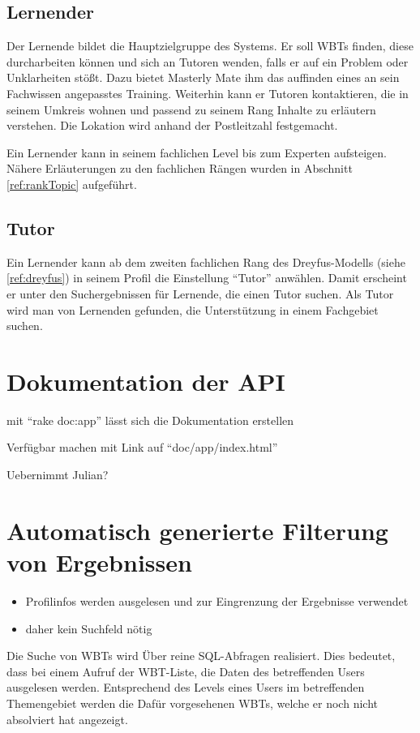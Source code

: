 \subsection{Lernender}
Der Lernende bildet die Hauptzielgruppe des Systems. Er soll WBTs finden, diese
durcharbeiten können und sich an Tutoren wenden, falls er auf ein Problem oder
Unklarheiten stößt. Dazu bietet Masterly Mate ihm das auffinden eines an sein
Fachwissen angepasstes Training. Weiterhin kann er Tutoren kontaktieren, die in
seinem Umkreis wohnen und passend zu seinem Rang Inhalte zu erläutern verstehen.
Die Lokation wird anhand der Postleitzahl festgemacht.

Ein Lernender kann in seinem fachlichen Level bis zum Experten aufsteigen.
Nähere Erläuterungen zu den fachlichen Rängen wurden in Abschnitt
\ref{ref:rankTopic} aufgeführt.

\subsection{Tutor}
Ein Lernender kann ab dem zweiten fachlichen Rang des Dreyfus-Modells (siehe
\ref{ref:dreyfus}) in seinem Profil die Einstellung "`Tutor"' anwählen. Damit
erscheint er unter den Suchergebnissen für Lernende, die einen Tutor suchen. Als
Tutor wird man von Lernenden gefunden, die Unterstützung in einem Fachgebiet
suchen.

\section{Dokumentation der API}
\begin {k}
mit "`rake doc:app"' lässt sich die Dokumentation erstellen

Verfügbar machen mit Link auf "`doc/app/index.html"'

Uebernimmt Julian?
\end{k}

\section{Automatisch generierte Filterung von Ergebnissen}
\begin{k}
\begin{itemize}
  \item Profilinfos werden ausgelesen und zur Eingrenzung der Ergebnisse
  verwendet
  \item daher kein Suchfeld nötig
\end{itemize}
\end{k}
Die Suche von WBTs wird Über reine SQL-Abfragen realisiert. 
Dies bedeutet, dass bei einem Aufruf der WBT-Liste, die Daten des betreffenden Users ausgelesen werden. 
Entsprechend des Levels eines Users im betreffenden Themengebiet werden die
Dafür vorgesehenen WBTs, welche er noch nicht absolviert hat angezeigt. 

